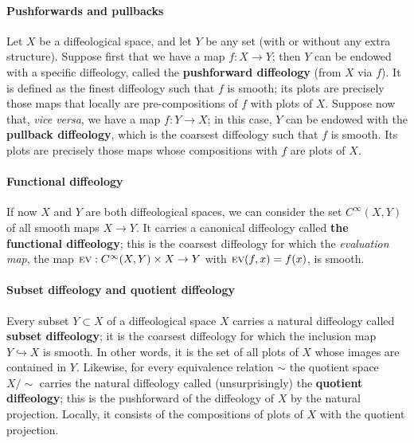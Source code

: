 \documentclass{article}
\begin{document}
\paragraph{Pushforwards and pullbacks} Let $X$ be a diffeological space, and let $Y$ be any set (with or without any extra structure). Suppose first that we have a map $f:X\to Y$; then $Y$ can be endowed
with a specific diffeology, called the \textbf{pushforward diffeology} (from $X$ via $f$). It is defined as the finest diffeology such that $f$ is smooth; its plots are precisely those maps that locally are 
pre-compositions of $f$ with plots of $X$. Suppose now that, \emph{vice versa}, we have a map $f:Y\to X$; in this case, $Y$ can be endowed with the \textbf{pullback diffeology}, which is the coarsest diffeology 
such that $f$ is smooth. Its plots are precisely those maps whose compositions with $f$ are plots of $X$.

\paragraph{Functional diffeology} If now $X$ and $Y$ are both diffeological spaces, we can consider the set $C^{\infty}(X,Y)$ of all smooth maps $X\to Y$. It carries a canonical diffeology called \textbf{the 
functional diffeology}; this is the coarsest diffeology for which the \emph{evaluation map}, the map $\mbox{\textsc{ev}}:C^{\infty}(X,Y)\times X\to Y$ with $\mbox{\textsc{ev}}(f,x)=f(x)$, is smooth.

\paragraph{Subset diffeology and quotient diffeology} Every subset $Y\subset X$ of a diffeological space $X$ carries a natural diffeology called \textbf{subset diffeology}; it is the coarsest diffeology for which 
the inclusion map $Y\hookrightarrow X$ is smooth. In other words, it is the set of all plots of $X$ whose images are contained in $Y$. Likewise, for every equivalence relation $\sim$ the quotient space 
$X/\sim$ carries the natural diffeology called (unsurprisingly) the \textbf{quotient  diffeology}; this is the pushforward of the diffeology of $X$ by the natural projection. Locally, it consists of the compositions 
of plots of $X$ with the quotient projection.
\end{document}
